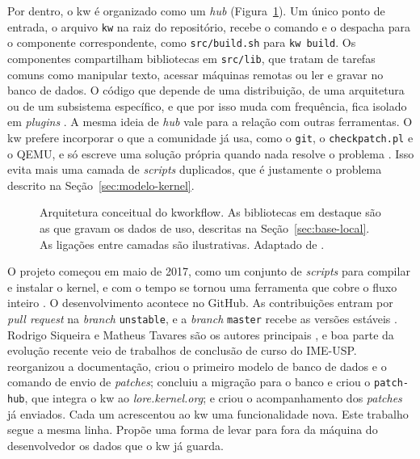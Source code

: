 

Por dentro, o kw é organizado como um \textit{hub}
(Figura~\ref{fig:arquitetura-kw}). Um único ponto de entrada, o arquivo
\texttt{kw} na raiz do repositório, recebe o comando e o despacha para o
componente correspondente, como \texttt{src/build.sh} para \texttt{kw build}.
Os componentes compartilham bibliotecas em \texttt{src/lib}, que tratam de
tarefas comuns como manipular texto, acessar máquinas remotas ou ler e gravar
no banco de dados. O código que depende de uma distribuição, de uma
arquitetura ou de um subsistema específico, e que por isso muda com
frequência, fica isolado em \textit{plugins} \citep{tadokoro2025kw,
neto2022kw}. A mesma ideia de \textit{hub} vale para a relação com outras
ferramentas. O kw prefere incorporar o que a comunidade já usa, como o
\texttt{git}, o \texttt{checkpatch.pl} e o QEMU, e só escreve uma solução
própria quando nada resolve o problema \citep{tadokoro2025kw}. Isso evita mais
uma camada de \textit{scripts} duplicados, que é justamente o problema
descrito na Seção~\ref{sec:modelo-kernel}.

\begin{figure}[htbp]
  \centering
  \resizebox{0.85\textwidth}{!}{}
  \caption{Arquitetura conceitual do kworkflow. As bibliotecas em destaque
    são as que gravam os dados de uso, descritas na Seção~\ref{sec:base-local}.
    As ligações entre camadas são ilustrativas. Adaptado de
    \citet{tadokoro2025kw}.}
  \label{fig:arquitetura-kw}
\end{figure}

O projeto começou em maio de 2017, como um conjunto de \textit{scripts} para
compilar e instalar o kernel, e com o tempo se tornou uma ferramenta que cobre
o fluxo inteiro \citep{kworkflowrepo, neto2022kw}. O desenvolvimento acontece
no GitHub. As contribuições entram por \textit{pull request} na
\textit{branch} \texttt{unstable}, e a \textit{branch} \texttt{master} recebe
as versões estáveis \citep{neto2022kw}. Rodrigo Siqueira e Matheus Tavares
são os autores principais \citep{tadokoro2025kw}, e boa parte da evolução
recente veio de trabalhos de conclusão de curso do IME-USP.
\citet{neto2022kw} reorganizou a documentação, criou o primeiro modelo de
banco de dados e o comando de envio de \textit{patches};
\citet{tadokoro2023lore} concluiu a migração para o banco e criou o
\texttt{patch-hub}, que integra o kw ao \textit{lore.kernel.org}; e
\citet{souza2025kw} criou o acompanhamento dos \textit{patches} já enviados.
Cada um acrescentou ao kw uma funcionalidade nova. Este trabalho segue a mesma
linha. Propõe uma forma de levar para fora da máquina do desenvolvedor os dados
que o kw já guarda.

